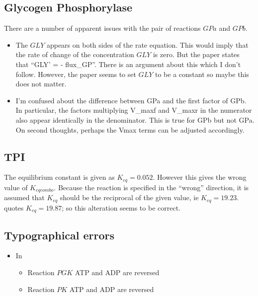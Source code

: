 \message{ !name(LamKus02_report.tex)}\documentclass[12pt,a4paper]{article}
\begin{document}
\subsection{Glycogen Phosphorylase}
There are a number of apparent issues with the pair of reactions $GPa$
and $GPb$.
\begin{itemize}
\item The $GLY$ appears on both sides of the rate equation. This would
  imply that the rate of change of the concentration $GLY$ is
  zero. But the paper states that ``GLY' = - flux\_GP''. There is an
  argument about this which I don't follow. However, the paper seems
  to set $GLY$ to be a constant so maybe this does not matter.
\item I'm confused about the difference between GPa and the first
  factor of GPb. In particular, the factors multiplying V\_maxf and
  V\_maxr in the numerator also appear identically in the
  denominator. This is true for GPb but not GPa.
  On second thoughts, perhaps the Vmax terms can be adjusted accordingly.
\end{itemize}

\subsection{TPI}
\label{sec:TPI}
The equilibrium constant is given as $K_{eq} =  0.052$. However this
gives the wrong value of $K_{eqcombo}$. Because the reaction is
specified in the ``wrong'' direction, it is assumed that $K_{eq}$
should be the reciprocal of the given value, ie $K_{eq} = 19.23$.
\citet{Bea12} quotes $K_{eq} = 19.87$; so this alteration seems to be
correct.



\subsection{Typographical errors}
\begin{itemize}
\item In \citet[Figure 1]{LamKus02}
  \begin{itemize}
  \item Reaction $PGK$ ATP and ADP are reversed
  \item Reaction $PK$ ATP and ADP are reversed
  \end{itemize}
\end{itemize}
\end{document}
